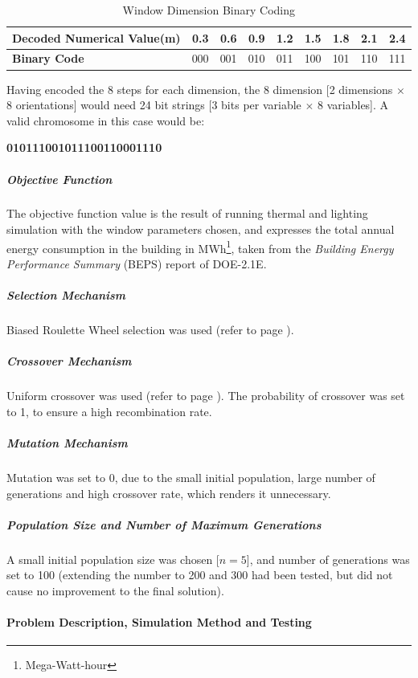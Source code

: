 \begin{table}[h]
\centering
\begin{tabular}{l|rrrrrrrr}
\textbf{Decoded Numerical Value(m)}&0.3&0.6&0.9&1.2&1.5&1.8&2.1&2.4\\ \hline
\textbf{Binary Code}&000&001&010&011&100&101&110&111\\
\end{tabular}
\caption{Window Dimension Binary Coding}
\label{table:WinDimCode}
\end{table}

Having encoded the 8 steps for each dimension, the 8 dimension [2 dimensions $\times$ 8 orientations] would need 24 bit strings [3 bits per variable $\times$ 8 variables]. A valid chromosome in this case would be:\\
\vspace{0.3cm}
\begin{center}
\textbf{010111001011100110001110}
\end{center}

\subparagraph{Objective Function}\mbox{}

The objective function value is the result of running thermal and lighting simulation with the window parameters chosen, and expresses the total annual energy consumption in the building in MWh\footnote{Mega-Watt-hour}, taken from the \emph{Building Energy Performance Summary} (BEPS) report of DOE-2.1E.

\subparagraph{Selection Mechanism}\mbox{}

Biased Roulette Wheel selection was used (refer to page \pageref{eqn:BiasedRoulette}).

\subparagraph{Crossover Mechanism}\mbox{}

Uniform crossover was used (refer to page \pageref{eqn:UniformCross}). The probability of crossover was set to 1, to ensure a high recombination rate.

\subparagraph{Mutation Mechanism}\mbox{}

Mutation was set to 0, due to the small initial population, large number of generations and high crossover rate, which renders it unnecessary.

\subparagraph{Population Size and Number of Maximum Generations}\mbox{}

A small initial population size was chosen [$n=5$], and number of generations was set to 100 (extending the number to 200 and 300 had been tested, but did not cause no improvement to the final solution).

\paragraph{Problem Description, Simulation Method and Testing}\mbox{}

